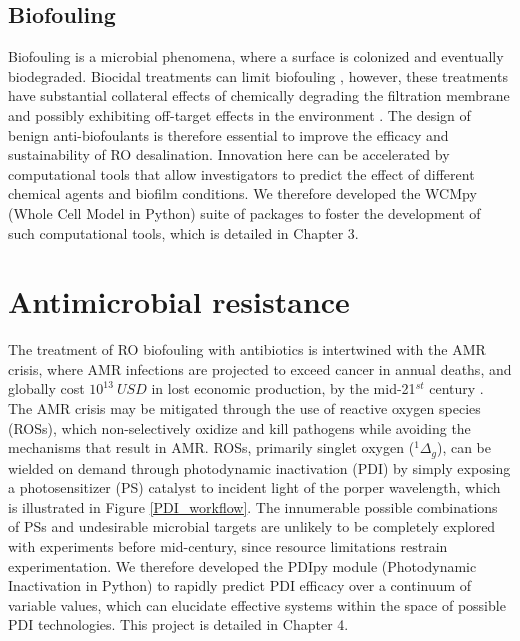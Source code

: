 \subsection{Biofouling}
Biofouling is a microbial phenomena, where a surface is colonized and eventually biodegraded. Biocidal treatments can limit biofouling \cite{Kim2009BiocideOverview}, however, these treatments have substantial collateral effects of chemically degrading the filtration membrane \cite{Da-Silva-Correa2022TheReview} and possibly exhibiting off-target effects in the environment \cite{Martins2018Review:Ecosystems,Thomas2001AntifoulingEffects}. The design of benign anti-biofoulants \cite{Buckley2017DesignProducts} is therefore essential to improve the efficacy and sustainability of RO desalination. Innovation here \cite{Winters1983ControlDesalination} can be accelerated by computational tools that allow investigators to predict the effect of different chemical agents and biofilm conditions. We therefore developed the WCMpy (Whole Cell Model in Python) suite of packages to foster the development of such computational tools, which is detailed in Chapter 3. 


\section{Antimicrobial resistance}
The treatment of RO biofouling with antibiotics is intertwined with the AMR crisis, where AMR infections are projected to exceed cancer in annual deaths, and globally cost $10^{13}~USD$ in lost economic production, by the mid-21$^{st}$ century \cite{ONeill2014AntimicrobialNations}. The AMR crisis may be mitigated through the use of reactive oxygen species (ROSs), which non-selectively oxidize and kill pathogens while avoiding the mechanisms that result in AMR. ROSs, primarily singlet oxygen ($^1\Delta_g$), can be wielded on demand through photodynamic inactivation (PDI) by simply exposing a photosensitizer (PS) catalyst to incident light of the porper wavelength, which is illustrated in Figure \ref{PDI_workflow}. The innumerable possible combinations of PSs and undesirable microbial targets are unlikely to be completely explored with experiments before mid-century, since resource limitations restrain experimentation. We therefore developed the PDIpy module (Photodynamic Inactivation in Python) to rapidly predict PDI efficacy over a continuum of variable values, which can elucidate effective systems within the space of possible PDI technologies. This project is detailed in Chapter 4. 

